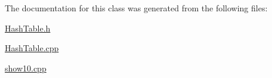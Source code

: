 The documentation for this class was generated from the following files\+:\begin{DoxyCompactItemize}
\item 
\hyperlink{_hash_table_8h}{Hash\+Table.\+h}\item 
\hyperlink{_hash_table_8cpp}{Hash\+Table.\+cpp}\item 
\hyperlink{show10_8cpp}{show10.\+cpp}\end{DoxyCompactItemize}
